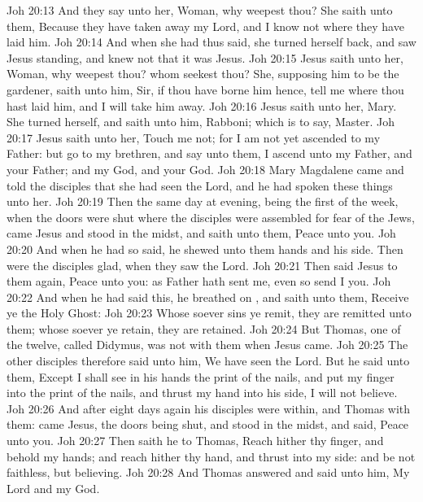 \vs Joh 20:13 And they say unto her, Woman, why weepest thou? She saith unto them, Because they have taken away my Lord, and I know not where they have laid him.
\vs Joh 20:14 And when she had thus said, she turned herself back, and saw Jesus standing, and knew not that it was Jesus.
\vs Joh 20:15 Jesus saith unto her, Woman, why weepest thou? whom seekest thou? She, supposing him to be the gardener, saith unto him, Sir, if thou have borne him hence, tell me where thou hast laid him, and I will take him away.
\vs Joh 20:16 Jesus saith unto her, Mary. She turned herself, and saith unto him, Rabboni; which is to say, Master.
\vs Joh 20:17 Jesus saith unto her, Touch me not; for I am not yet ascended to my Father: but go to my brethren, and say unto them, I ascend unto my Father, and your Father; and  my God, and your God.
\vs Joh 20:18 Mary Magdalene came and told the disciples that she had seen the Lord, and  he had spoken these things unto her.
\vs Joh 20:19 Then the same day at evening, being the first  of the week, when the doors were shut where the disciples were assembled for fear of the Jews, came Jesus and stood in the midst, and saith unto them, Peace  unto you.
\vs Joh 20:20 And when he had so said, he shewed unto them  hands and his side. Then were the disciples glad, when they saw the Lord.
\vs Joh 20:21 Then said Jesus to them again, Peace  unto you: as  Father hath sent me, even so send I you.
\vs Joh 20:22 And when he had said this, he breathed on , and saith unto them, Receive ye the Holy Ghost:
\vs Joh 20:23 Whose soever sins ye remit, they are remitted unto them;  whose soever  ye retain, they are retained.
\vs Joh 20:24 But Thomas, one of the twelve, called Didymus, was not with them when Jesus came.
\vs Joh 20:25 The other disciples therefore said unto him, We have seen the Lord. But he said unto them, Except I shall see in his hands the print of the nails, and put my finger into the print of the nails, and thrust my hand into his side, I will not believe.
\vs Joh 20:26 And after eight days again his disciples were within, and Thomas with them:  came Jesus, the doors being shut, and stood in the midst, and said, Peace  unto you.
\vs Joh 20:27 Then saith he to Thomas, Reach hither thy finger, and behold my hands; and reach hither thy hand, and thrust  into my side: and be not faithless, but believing.
\vs Joh 20:28 And Thomas answered and said unto him, My Lord and my God.
